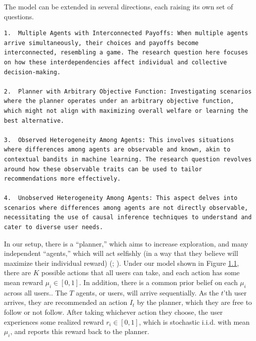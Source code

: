 \documentclass[
  letterpaper,
  numbers=noenddot,
  DIV=11]{scrreprt}
\theoremstyle{definition}
\theoremstyle{plain}
\theoremstyle{plain}
\theoremstyle{remark}
\begin{document}
The model can be extended in several directions, each raising its own
set of questions.

\begin{verbatim}
1.  Multiple Agents with Interconnected Payoffs: When multiple agents arrive simultaneously, their choices and payoffs become interconnected, resembling a game. The research question here focuses on how these interdependencies affect individual and collective decision-making.

2.  Planner with Arbitrary Objective Function: Investigating scenarios where the planner operates under an arbitrary objective function, which might not align with maximizing overall welfare or learning the best alternative.

3.  Observed Heterogeneity Among Agents: This involves situations where differences among agents are observable and known, akin to contextual bandits in machine learning. The research question revolves around how these observable traits can be used to tailor recommendations more effectively.

4.  Unobserved Heterogeneity Among Agents: This aspect delves into scenarios where differences among agents are not directly observable, necessitating the use of causal inference techniques to understand and cater to diverse user needs.
\end{verbatim}

In our setup, there is a ``planner,'' which aims to increase
exploration, and many independent ``agents,'' which will act selfishly
(in a way that they believe will maximize their individual reward)
(;
). Under our model shown in Figure
\hyperref[fig-planner-agent]{1.1}, there are \(K\) possible actions that
all users can take, and each action has some mean reward
\(\mu_i \in [0, 1]\). In addition, there is a common prior belief on
each \(\mu_i\) across all users.. The \(T\) agents, or users, will
arrive sequentially. As the \(t\)'th user arrives, they are recommended
an action \(I_t\) by the planner, which they are free to follow or not
follow. After taking whichever action they choose, the user experiences
some realized reward \(r_i \in [0, 1]\), which is stochastic i.i.d. with
mean \(\mu_i\), and reports this reward back to the planner.
\end{document}
